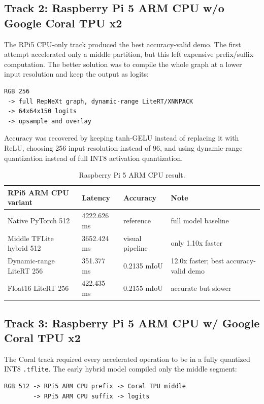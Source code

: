 \documentclass[11pt]{article}
\begin{document}
\subsection{Track 2: Raspberry Pi 5 ARM CPU w/o Google Coral TPU x2}

The RPi5 CPU-only track produced the best accuracy-valid demo. The first attempt accelerated only a middle partition, but this left expensive prefix/suffix computation. The better solution was to compile the whole graph at a lower input resolution and keep the output as logits:

\begin{lstlisting}
RGB 256
 -> full RepNeXt graph, dynamic-range LiteRT/XNNPACK
 -> 64x64x150 logits
 -> upsample and overlay
\end{lstlisting}

Accuracy was recovered by keeping tanh-GELU instead of replacing it with ReLU, choosing 256 input resolution instead of 96, and using dynamic-range quantization instead of full INT8 activation quantization.

\begin{table}[H]
\centering
\caption{Raspberry Pi 5 ARM CPU result.}
\small
\begin{tabularx}{\textwidth}{Y Z{0.18\textwidth} Z{0.18\textwidth}Y}
\toprule
RPi5 ARM CPU variant & Latency & Accuracy & Note \\
\midrule
Native PyTorch 512 & 4222.626 ms & reference & full model baseline \\
Middle TFLite hybrid 512 & 3652.424 ms & visual pipeline & only 1.10x faster \\
Dynamic-range LiteRT 256 & 351.377 ms & 0.2135 mIoU & 12.0x faster; best accuracy-valid demo \\
Float16 LiteRT 256 & 422.435 ms & 0.2155 mIoU & accurate but slower \\
\bottomrule
\end{tabularx}
\end{table}

\subsection{Track 3: Raspberry Pi 5 ARM CPU w/ Google Coral TPU x2}

The Coral track required every accelerated operation to be in a fully quantized INT8 \texttt{.tflite}. The early hybrid model compiled only the middle segment:

\begin{lstlisting}
RGB 512 -> RPi5 ARM CPU prefix -> Coral TPU middle
        -> RPi5 ARM CPU suffix -> logits
\end{lstlisting}
\end{document}
